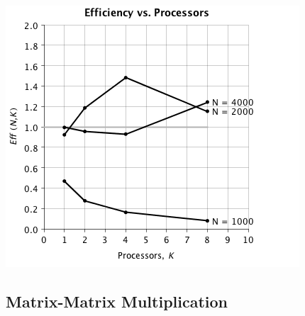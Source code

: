 \documentclass{dependencies/acm_proc_article-sp}
\begin{document}
\begin{center}
\includegraphics[scale=0.5]{images/matrix-vector/eff-vs-proc.png}
\end{center}


\subsection{Matrix-Matrix Multiplication}
\end{document}
